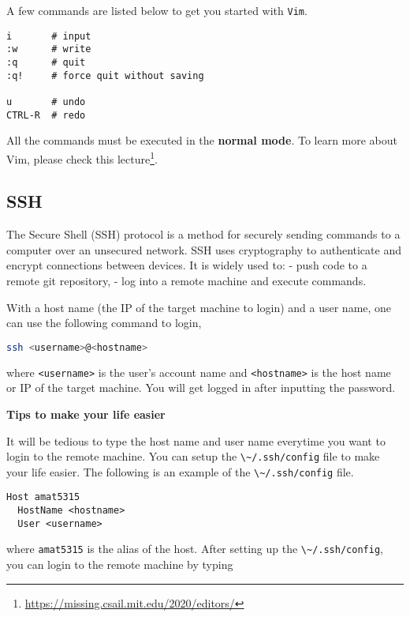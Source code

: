 \documentclass[
  notoc %
]{tufte-book}
\DeclareRobustCommand{\href}[2]{#2\footnote{\url{#1}}}
\newcommand{\passthrough}[1]{#1}
\begin{document}
A few commands are listed below to get you started with
\passthrough{\lstinline!Vim!}.

\begin{lstlisting}
i       # input
:w      # write
:q      # quit
:q!     # force quit without saving

u       # undo
CTRL-R  # redo
\end{lstlisting}

All the commands must be executed in the \textbf{normal mode}. To learn
more about Vim, please check this
\href{https://missing.csail.mit.edu/2020/editors/}{lecture}.

\hypertarget{sec:ssh}{%
\subsection{SSH}\label{sec:ssh}}

The Secure Shell (SSH) protocol is a method for securely sending
commands to a computer over an unsecured network. SSH uses cryptography
to authenticate and encrypt connections between devices. It is widely
used to: - push code to a remote git repository, - log into a remote
machine and execute commands.

With a host name (the IP of the target machine to login) and a user
name, one can use the following command to login,

\begin{lstlisting}[language=bash]
ssh <username>@<hostname>
\end{lstlisting}

where \passthrough{\lstinline!<username>!} is the user's account name
and \passthrough{\lstinline!<hostname>!} is the host name or IP of the
target machine. You will get logged in after inputting the password.

\textbf{Tips to make your life easier}

It will be tedious to type the host name and user name everytime you
want to login to the remote machine. You can setup the
\passthrough{\lstinline!\~/.ssh/config!} file to make your life easier.
The following is an example of the
\passthrough{\lstinline!\~/.ssh/config!} file.

\begin{lstlisting}
Host amat5315
  HostName <hostname>
  User <username>
\end{lstlisting}

where \passthrough{\lstinline!amat5315!} is the alias of the host. After
setting up the \passthrough{\lstinline!\~/.ssh/config!}, you can login
to the remote machine by typing
\end{document}
